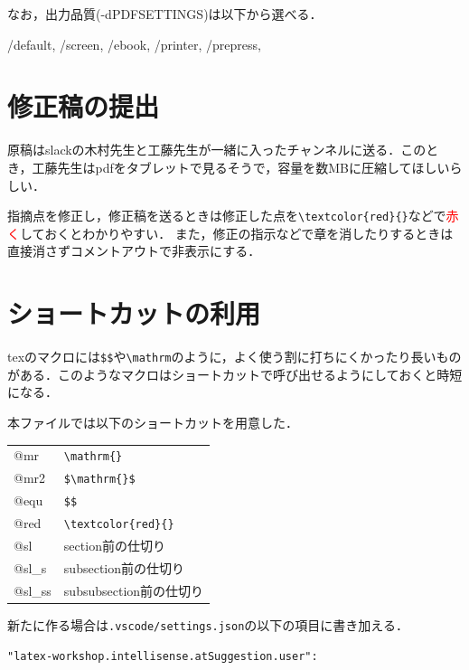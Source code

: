 \documentclass[twocolumn, a4paper]{Zemiresume}
\begin{document}
なお，出力品質(-dPDFSETTINGS)は以下から選べる．

{
  \small %
  /default,
  /screen,
  /ebook,
  /printer,
  /prepress,
}
\section{修正稿の提出}
原稿はslackの木村先生と工藤先生が一緒に入ったチャンネルに送る．このとき，工藤先生はpdfをタブレットで見るそうで，容量を数MBに圧縮してほしいらしい．

指摘点を修正し，修正稿を送るときは修正した点を\verb|\textcolor{red}{}|などで\textcolor{red}{赤く}しておくとわかりやすい．
また，修正の指示などで章を消したりするときは直接消さずコメントアウトで非表示にする．
\section{ショートカットの利用}
texのマクロには\verb|$$|や\verb|\mathrm|のように，よく使う割に打ちにくかったり長いものがある．このようなマクロはショートカットで呼び出せるようにしておくと時短になる．

本ファイルでは以下のショートカットを用意した．

\begin{tabular}{ll}
  @mr  & \verb|\mathrm{}|\\
  @mr2 & \verb|$\mathrm{}$|\\
  @equ & \verb|$$|\\
  @red & \verb|\textcolor{red}{}|\\
  @sl & section前の仕切り\\
  @sl\_s & subsection前の仕切り\\
  @sl\_ss & subsubsection前の仕切り
\end{tabular}

新たに作る場合は\verb|.vscode/settings.json|の以下の項目に書き加える．

{\small
\verb|"latex-workshop.intellisense.atSuggestion.user":|}
{\small


}
\end{document}
